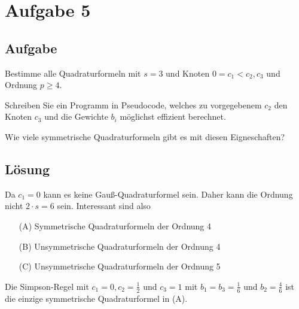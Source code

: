 \section*{Aufgabe 5}
\subsection*{Aufgabe}
Bestimme alle Quadraturformeln mit $s=3$ und Knoten
$0 = c_1 < c_2, c_3$ und Ordnung $p \geq 4$.

Schreiben Sie ein Programm in Pseudocode, welches zu vorgegebenem
$c_2$ den Knoten $c_3$ und die Gewichte $b_i$ möglichst effizient 
berechnet.

Wie viele symmetrische Quadraturformeln gibt es mit diesen Eigneschaften?

\subsection*{Lösung}
Da $c_1 = 0$ kann es keine Gauß-Quadraturformel sein. Daher kann 
die Ordnung nicht $2 \cdot s = 6$ sein. Interessant sind also 
\begin{itemize}
    \item[(A)] Symmetrische Quadraturformeln der Ordnung 4
    \item[(B)] Unsymmetrische Quadraturformeln der Ordnung 4
    \item[(C)] Unsymmetrische Quadraturformeln der Ordnung 5
\end{itemize}

Die Simpson-Regel mit $c_1 = 0, c_2 = \frac{1}{2}$ und $c_3 = 1$
mit $b_1 = b_3 = \frac{1}{6}$ und $b_2 = \frac{4}{6}$ ist die einzige
symmetrische Quadraturformel in (A).

